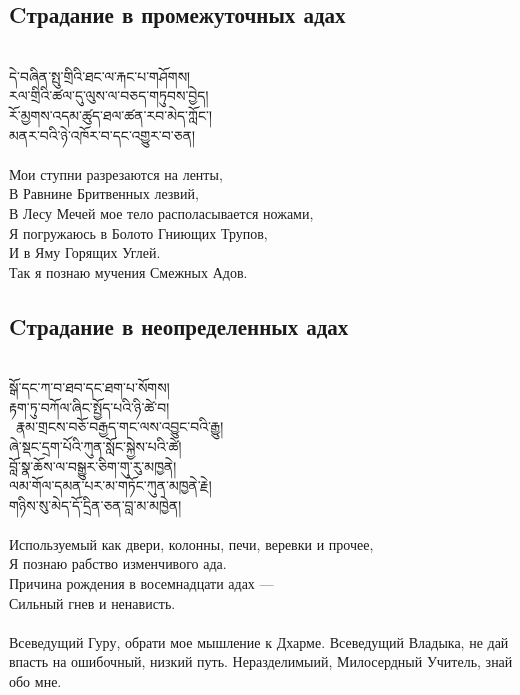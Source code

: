 \newpage
\subsection*{Cтрадание в промежуточных адах}
\\
\ti
དེ་བཞིན་སྤུ་གྲིའི་ཐང་ལ་རྐང་པ་གཤོགས།\\
རལ་གྲིའི་ཚལ་དུ་ལུས་ལ་བཅད་གཏུབས་བྱེད།\\
རོ་མྱགས་འདམ་ཚུད་ཐལ་ཚན་རབ་མེད་ཀློང་། \\
མནར་བའི་ཉེ་འཁོར་བ་དང་འགྱུར་བ་ཅན།\\
\\
\ru
Мои ступни разрезаются на ленты,\\
В Равнине Бритвенных лезвий,\\
В Лесу Мечей мое тело располасывается ножами,\\
Я погружаюсь в Болото Гниющих Трупов,\\
И в Яму Горящих Углей.\\
Так я познаю мучения Смежных Адов.

\subsection*{Cтрадание в неопределенных адах}
\\
\ti
སྒོ་དང་ཀ་བ་ཐབ་དང་ཐག་པ་སོགས།\\
རྟག་ཏུ་བཀོལ་ཞིང་སྤྱོད་པའི་ཉི་ཚེ་བ། \\\
རྣམ་གྲངས་བཅོ་བརྒྱད་གང་ལས་འབྱུང་བའི་རྒྱུ། \\
ཞེ་སྡང་དྲག་པོའི་ཀུན་སློང་སྐྱེས་པའི་ཚེ། \\
བློ་སྣ་ཆོས་ལ་བསྒྱུར་ཅིག་གུ་རུ་མཁྱནེ། \\
ལམ་གོལ་དམན་པར་མ་གཏོང་ཀུན་མཁྱནེ་རྗེ། \\
གཉིས་སུ་མེད་དོ་དྲིན་ཅན་བླ་མ་མཁྱེན།\\
\\
\ru
Используемый как двери, колонны, печи, веревки и прочее,\\
Я познаю рабство изменчивого ада.\\
Причина рождения в восем\-надцати адах —\\
Сильный гнев и ненависть.\\
\\
Всеведущий Гуру, обрати мое мышление к Дхарме.
Всеведущий Владыка, не дай впасть на ошибочный, низкий путь.
Нераздели\-мыий, Милосердный Учитель, знай обо мне.

\newpage
